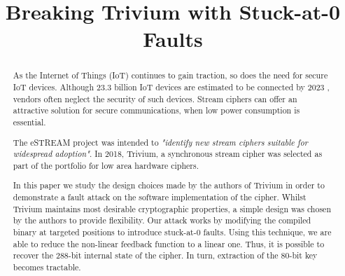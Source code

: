 \documentclass[conference]{IEEEtran}
\begin{document}
\title{Breaking Trivium with Stuck-at-0 Faults}

\author{
}

\maketitle

\begin{abstract}
As the Internet of Things (IoT) continues to gain traction, so does the need for secure IoT devices. Although 23.3 billion IoT devices are estimated to be connected by 2023 \cite{iot}, vendors often neglect the security of such devices. Stream ciphers can offer an attractive solution for secure communications, when low power consumption is essential. 

The eSTREAM project was intended to \textit{"identify new stream ciphers suitable for widespread adoption"}.\cite{call} In 2018, Trivium, a synchronous stream cipher was selected as part of the portfolio for low area hardware ciphers. 

In this paper we study the design choices made by the authors of Trivium in order to demonstrate a fault attack on the software implementation of the cipher. Whilst Trivium maintains most desirable cryptographic properties, a simple design was chosen by the authors to provide flexibility. Our attack works by modifying the compiled binary at targeted positions to introduce stuck-at-0 faults. Using this technique, we are able to reduce the non-linear feedback function to a linear one. Thus, it is possible to recover the 288-bit internal state of the cipher. In turn, extraction of the 80-bit key becomes tractable.
\end{abstract}
\end{document}
